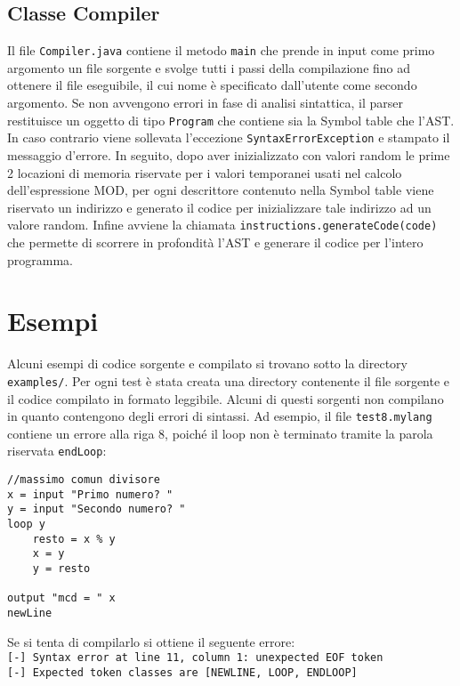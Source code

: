 \documentclass[10pt,a4paper]{article}
\begin{document}
\subsection{Classe Compiler}
Il file \texttt{Compiler.java} contiene il metodo \texttt{main} che prende in input come primo argomento un file sorgente e svolge tutti i passi della compilazione fino ad ottenere il file eseguibile, il cui nome è specificato dall'utente come secondo argomento.
Se non avvengono errori in fase di analisi sintattica, il parser restituisce un oggetto di tipo \texttt{Program} che contiene sia la Symbol table che l'AST. In caso contrario viene sollevata l'eccezione \texttt{SyntaxErrorException} e stampato il messaggio d'errore. In seguito, dopo aver inizializzato con valori random le prime 2 locazioni di memoria riservate per i valori temporanei usati nel calcolo dell'espressione MOD, per ogni descrittore contenuto nella Symbol table viene riservato un indirizzo e generato il codice per inizializzare tale indirizzo ad un valore random. Infine avviene la chiamata \texttt{instructions.generateCode(code)} che permette di scorrere in profondità l'AST e generare il codice per l'intero programma.

\section{Esempi}
Alcuni esempi di codice sorgente e compilato si trovano sotto la directory \texttt{examples/}. Per ogni test è stata creata una directory contenente il file sorgente e il codice compilato in formato leggibile. Alcuni di questi sorgenti non compilano in quanto contengono degli errori di sintassi. Ad esempio, il file \texttt{test8.mylang} contiene un errore alla riga 8, poiché il loop non è terminato tramite la parola riservata \texttt{endLoop}:

\lstset{numbers=left, numberstyle=\small, numbersep=8pt, frame=leftline, xleftmargin=20pt}
\lstset{basicstyle=\ttfamily,breaklines=true}
\begin{lstlisting} 
//massimo comun divisore
x = input "Primo numero? "
y = input "Secondo numero? "
loop y
    resto = x % y 
    x = y
    y = resto

output "mcd = " x
newLine
\end{lstlisting}

Se si tenta di compilarlo si ottiene il seguente errore: \\
\texttt{[-] Syntax error at line 11, column 1: unexpected EOF token}\\
\texttt{[-] Expected token classes are [NEWLINE, LOOP, ENDLOOP]}
\end{document}
